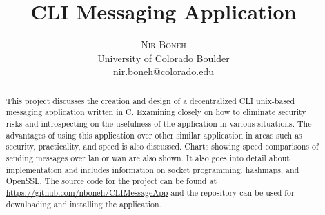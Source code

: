 \documentclass[twoside]{article}
\title{\vspace{-15mm}\fontsize{24pt}{10pt}\selectfont\textbf{CLI Messaging Application}} %
\author{
\large
\textsc{Nir Boneh}\\[2mm] %
\normalsize University of Colorado Boulder \\ %
\normalsize \href{mailto:nir.boneh@colorado.edu}{nir.boneh@colorado.edu} \\ %
\vspace{-5mm}
}
\date{}
\begin{document}
\maketitle %

\thispagestyle{fancy} %


\begin{abstract}

\noindent
This project discusses the creation and design of a decentralized CLI unix-based messaging application written in C. Examining 
closely on how to eliminate security risks and introspecting on the usefulness of the application in various situations. The 
advantages of using this application over other similar application in areas such as security, practicality, and speed is also 
discussed. Charts showing speed comparisons of sending messages over lan or wan are also shown. It also goes into detail about implementation and includes information on socket programming, hashmaps, and OpenSSL. The source code for the project can be found at \href{https://github.com/nboneh/CLIMessageApp}{https://github.com/nboneh/CLIMessageApp} and the repository can be used for downloading and installing the application.

\end{abstract}

\end{document}
